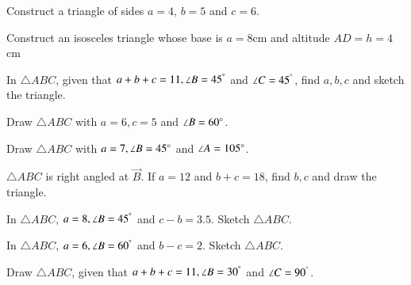 


\item Construct a triangle of sides $a=4$, $b=5$  and $c=6$.  
\\
\solution


\item Construct an isosceles triangle whose base is $a=8$cm and altitude $AD=h=4$cm 
\\
\solution


\item In $\triangle ABC$,  given that $a+b+c = 11, \angle B = 45^{\degree}$ and $\angle C = 45^{\degree}$, 
find 
$a,b,c$ and sketch the triangle.
\\
\solution


\item Draw $\triangle ABC$ with $a = 6, c = 5$ and $\angle B = 60 \degree$. 
\\
\solution


\item Draw $\triangle ABC$ with $a = 7, \angle B = 45\degree$ and $\angle A = 105 \degree$. 
\\
\solution


\item $\triangle ABC$ is right angled at $\vec{B}$.  If $a = 12$ and $b+c = 18$, find $b,c$ and draw the triangle.
\\
\solution

\item In $\triangle ABC$,  $a = 8, \angle B = 45^{\degree}$ and $c-b = 3.5$.
Sketch $\triangle ABC$.
\\
\solution


\item In $\triangle ABC$,  $a = 6, \angle B = 60^{\degree}$ and $b-c = 2$. 
Sketch $\triangle ABC$.

\item Draw $\triangle ABC$,  given that $a+b+c = 11, \angle B = 30^{\degree}$ and $\angle C = 90^{\degree}$.
\\
\solution


